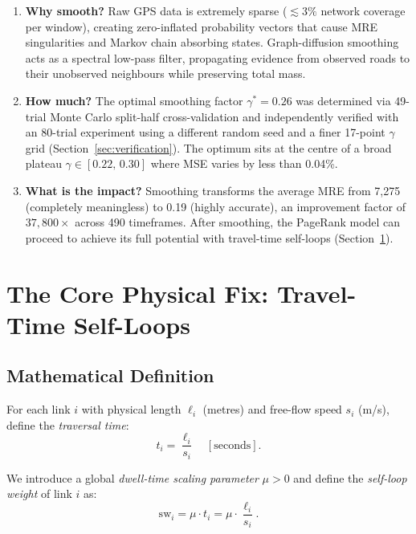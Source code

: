 \documentclass[12pt,a4paper]{article}
\theoremstyle{definition}
\theoremstyle{plain}
\newcommand{\sw}{\mathrm{sw}}
\begin{document}
\begin{enumerate}[label=\textbf{S\arabic*.}]
  \item \textbf{Why smooth?}
    Raw GPS data is extremely sparse ($\lesssim 3\%$ network coverage per window),
    creating zero-inflated probability vectors that cause MRE singularities and Markov
    chain absorbing states. Graph-diffusion smoothing acts as a spectral low-pass filter,
    propagating evidence from observed roads to their unobserved neighbours while
    preserving total mass.

  \item \textbf{How much?}
    The optimal smoothing factor $\gamma^* = 0.26$ was determined via 49-trial Monte
    Carlo split-half cross-validation and independently verified with an 80-trial
    experiment using a different random seed and a finer 17-point $\gamma$ grid
    (Section~\ref{sec:verification}). The optimum sits at the centre of a broad plateau
    $\gamma \in [0.22,\, 0.30]$ where MSE varies by less than 0.04\%.

  \item \textbf{What is the impact?}
    Smoothing transforms the average MRE from 7{,}275 (completely meaningless) to 0.19
    (highly accurate), an improvement factor of $37{,}800\times$ across 490 timeframes.
    After smoothing, the PageRank model can proceed to achieve its full potential with
    travel-time self-loops (Section~\ref{sec:selfloop}).
\end{enumerate}

\section{The Core Physical Fix: Travel-Time Self-Loops}
\label{sec:selfloop}

\subsection{Mathematical Definition}

For each link $i$ with physical length $\ell_i$ (metres) and free-flow speed $s_i$
(m/s), define the \emph{traversal time}:
\begin{equation}
  t_i = \frac{\ell_i}{s_i} \quad [\text{seconds}].
\end{equation}

We introduce a global \emph{dwell-time scaling parameter} $\mu > 0$ and define the
\emph{self-loop weight} of link $i$ as:
\begin{equation}
  \boxed{\sw_i = \mu \cdot t_i = \mu \cdot \frac{\ell_i}{s_i}}.
  \label{eq:selfloop}
\end{equation}
\end{document}
